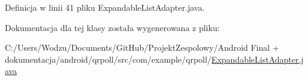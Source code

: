 Definicja w linii 41 pliku Expandable\+List\+Adapter.\+java.



Dokumentacja dla tej klasy została wygenerowana z pliku\+:\begin{DoxyCompactItemize}
\item 
C\+:/\+Users/\+Wodzu/\+Documents/\+Git\+Hub/\+Projekt\+Zespolowy/\+Android Final + dokumentacja/android/qrpoll/src/com/example/qrpoll/\hyperlink{_expandable_list_adapter_8java}{Expandable\+List\+Adapter.\+java}\end{DoxyCompactItemize}
